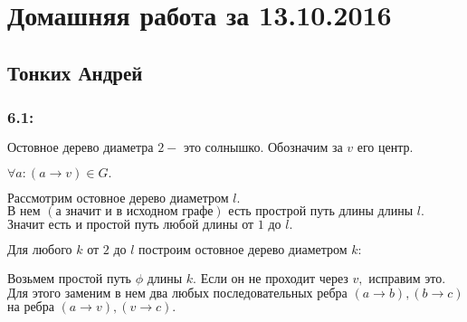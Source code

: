 \documentclass[12pt,a4paper]{scrartcl}
\def\p{\phi}
\def\A{\forall}
\begin{document}
\section*{ Домашняя работа за 13.10.2016}

\subsection*{  Тонких Андрей}

\subsubsection*{ 6.1:}

\(\text{Остовное }\allowbreak \text{дерево }\allowbreak \text{диаметра }\allowbreak 2 -\text{ это }\allowbreak \text{солнышко. }\allowbreak \text{Обозначим }\allowbreak \text{за }\allowbreak v\text{ его }\allowbreak \text{центр.}\allowbreak \)

\(\A a: (a \rightarrow  v) \in G.\)

\(\text{Рассмотрим }\allowbreak \text{остовное }\allowbreak \text{дерево }\allowbreak \text{диаметром }\allowbreak l.\)
\(\text{В }\allowbreak \text{нем }\allowbreak (\text{а }\allowbreak \text{значит }\allowbreak \text{и }\allowbreak \text{в }\allowbreak \text{исходном }\allowbreak \text{графе}\allowbreak )\text{ есть }\allowbreak \text{прострой }\allowbreak \text{путь }\allowbreak \text{длины }\allowbreak \text{длины }\allowbreak l.\)
\(\text{Значит }\allowbreak \text{есть }\allowbreak \text{и }\allowbreak \text{простой }\allowbreak \text{путь }\allowbreak \text{любой }\allowbreak \text{длины }\allowbreak \text{от }\allowbreak 1\text{ до }\allowbreak l.\)

\medskip
\(\text{Для }\allowbreak \text{любого }\allowbreak k\text{ от }\allowbreak 2\text{ до }\allowbreak l\text{ построим }\allowbreak \text{остовное }\allowbreak \text{дерево }\allowbreak \text{диаметром }\allowbreak k:\)

\(\text{Возьмем }\allowbreak \text{простой }\allowbreak \text{путь }\allowbreak \p\text{ длины }\allowbreak k.\)
\(\text{Если }\allowbreak \text{он }\allowbreak \text{не }\allowbreak \text{проходит }\allowbreak \text{через }\allowbreak v,\text{ исправим }\allowbreak \text{это.}\allowbreak \)
\(\text{Для }\allowbreak \text{этого }\allowbreak \text{заменим }\allowbreak \text{в }\allowbreak \text{нем }\allowbreak \text{два }\allowbreak \text{любых }\allowbreak \text{последовательных }\allowbreak \text{ребра }\allowbreak (a \rightarrow  b), (b \rightarrow  c)\)
\(\text{на }\allowbreak \text{ребра }\allowbreak (a \rightarrow  v), (v \rightarrow  c).\)
\end{document}
